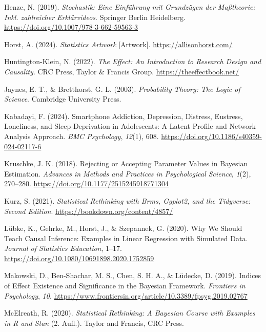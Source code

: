 \documentclass[
  ngerman,
  letterpaper,
  twoside,
  open=any]{scrbook}
\newlength{\cslhangindent}
\newenvironment{CSLReferences}[2] %
 {\begin{list}{}{%
  \setlength{\itemindent}{0pt}
  \setlength{\leftmargin}{0pt}
  \setlength{\parsep}{0pt}
  \ifodd #1
   \setlength{\leftmargin}{\cslhangindent}
   \setlength{\itemindent}{-1\cslhangindent}
  \fi
  \setlength{\itemsep}{#2\baselineskip}}}
 {\end{list}}
\theoremstyle{definition}
\theoremstyle{plain}
\theoremstyle{definition}
\theoremstyle{definition}
\theoremstyle{definition}
\theoremstyle{definition}
\theoremstyle{remark}
\begin{document}
\begin{CSLReferences}{1}{0}
Henze, N. (2019). \emph{Stochastik: Eine Einführung mit Grundzügen der
Maßtheorie: Inkl. zahlreicher Erklärvideos}. Springer Berlin Heidelberg.
\url{https://doi.org/10.1007/978-3-662-59563-3}

Horst, A. (2024). \emph{Statistics {Artwork}} {[}Artwork{]}.
\url{https://allisonhorst.com/}

Huntington-Klein, N. (2022). \emph{The Effect: An Introduction to
Research Design and Causality}. CRC Press, Taylor \& Francis Group.
\url{https://theeffectbook.net/}

Jaynes, E. T., \& Bretthorst, G. L. (2003). \emph{Probability Theory:
The Logic of Science}. Cambridge University Press.

Kabadayi, F. (2024). Smartphone Addiction, Depression, Distress,
Eustress, Loneliness, and Sleep Deprivation in Adolescents: A Latent
Profile and Network Analysis Approach. \emph{BMC Psychology},
\emph{12}(1), 608. \url{https://doi.org/10.1186/s40359-024-02117-6}

Kruschke, J. K. (2018). Rejecting or {Accepting Parameter Values} in
{Bayesian Estimation}. \emph{Advances in Methods and Practices in
Psychological Science}, \emph{1}(2), 270--280.
\url{https://doi.org/10.1177/2515245918771304}

Kurz, S. (2021). \emph{Statistical {Rethinking} with {Brms}, {Ggplot2},
and the {Tidyverse}: {Second Edition}}.
\url{https://bookdown.org/content/4857/}

Lübke, K., Gehrke, M., Horst, J., \& Szepannek, G. (2020). Why {We
Should Teach Causal Inference}: {Examples} in {Linear Regression} with
{Simulated Data}. \emph{Journal of Statistics Education}, 1--17.
\url{https://doi.org/10.1080/10691898.2020.1752859}

Makowski, D., Ben-Shachar, M. S., Chen, S. H. A., \& Lüdecke, D. (2019).
Indices of {Effect Existence} and {Significance} in the {Bayesian
Framework}. \emph{Frontiers in Psychology}, \emph{10}.
\url{https://www.frontiersin.org/article/10.3389/fpsyg.2019.02767}

McElreath, R. (2020). \emph{Statistical Rethinking: A {Bayesian} Course
with Examples in {R} and {Stan}} (2. Aufl.). {Taylor and Francis, CRC
Press}.


\end{CSLReferences}
\end{document}
